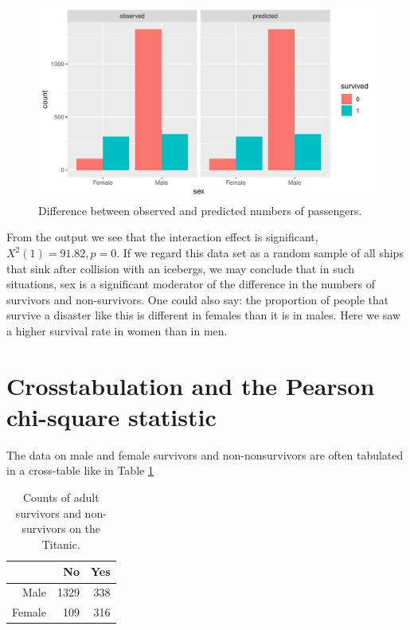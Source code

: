 \documentclass[]{book}\usepackage[]{graphicx}\usepackage[]{color}
\makeatletter
\def\maxwidth{ %
  \ifdim\Gin@nat@width>\linewidth
    \linewidth
  \else
    \Gin@nat@width
  \fi
}
\makeatother
\begin{document}
\begin{figure}

{\centering \includegraphics[width=\maxwidth]{figure/gen_23-1} 

}

\caption[Difference between observed and predicted numbers of passengers]{Difference between observed and predicted numbers of passengers.}\label{fig:gen_23}
\end{figure}



From the output we see that the interaction effect is significant, $X^2(1)=91.82, p=0$. If we regard this data set as a random sample of all ships that sink after collision with an icebergs, we may conclude that in such situations, sex is a significant moderator of the difference in the numbers of survivors and non-survivors. One could also say: the proportion of people that survive a disaster like this is different in females than it is in males. Here we saw a higher survival rate in women than in men.


\section{Crosstabulation and the Pearson chi-square statistic}

The data on male and female survivors and non-nonsurvivors are often tabulated in a cross-table like in Table \ref{tab:gen_24}


\begin{table}[ht]
\centering
\caption{Counts of adult survivors and non-survivors on the Titanic.} 
\label{tab:gen_24}
\begin{tabular}{rrr}
  \hline
 & No & Yes \\ 
  \hline
Male & 1329 & 338 \\ 
  Female & 109 & 316 \\ 
   \hline
\end{tabular}
\end{table}
\end{document}
